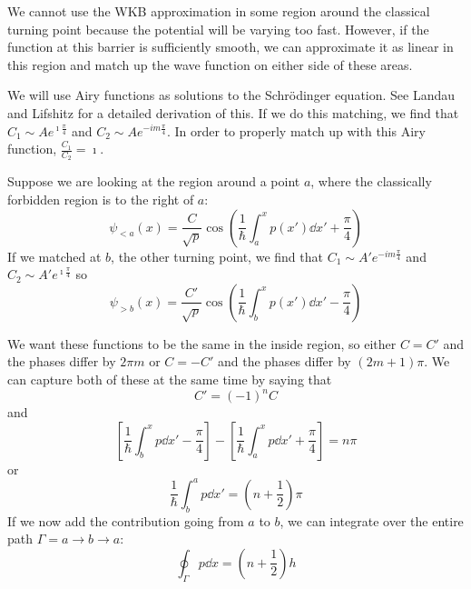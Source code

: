 \documentclass[a4paper,twoside,master.tex]{subfiles}
\begin{document}
We cannot use the WKB approximation in some region around the classical turning point because the potential will be varying too fast. However, if the function at this barrier is sufficiently smooth, we can approximate it as linear in this region and match up the wave function on either side of these areas.

We will use Airy functions as solutions to the Schr\"odinger equation. See Landau and Lifshitz for a detailed derivation of this. If we do this matching, we find that $ C_1 \sim A e^{\imath \frac{\pi}{4}} $ and $ C_2 \sim A e^{-im \frac{\pi}{4}} $. In order to properly match up with this Airy function, $ \frac{C_1}{C_2} = \imath $.

Suppose we are looking at the region around a point $ a $, where the classically forbidden region is to the right of $ a $:
\begin{equation}
    \psi_{<a}(x) = \frac{C}{\sqrt{p}} \cos(\frac{1}{\hbar} \int_a^x p(x') \dd{x'} + \frac{\pi}{4})
\end{equation}
If we matched at $ b $, the other turning point, we find that $ C_1 \sim A' e^{-im \frac{\pi}{4}} $ and $ C_2 \sim A' e^{\imath \frac{\pi}{4}}$ so
\begin{equation}
    \psi_{>b}(x) = \frac{C'}{\sqrt{p}} \cos(\frac{1}{\hbar} \int_b^x p(x') \dd{x'} - \frac{\pi}{4})
\end{equation}

We want these functions to be the same in the inside region, so either $ C = C' $ and the phases differ by $ 2 \pi m $ or $ C = -C' $ and the phases differ by $ (2m+1) \pi $. We can capture both of these at the same time by saying that
\begin{equation}
    C' = (-1)^n C
\end{equation}
and
\begin{equation}
    \left[ \frac{1}{\hbar} \int_b^x p \dd{x'} - \frac{\pi}{4} \right] - \left[ \frac{1}{\hbar} \int_a^x p \dd{x'} + \frac{\pi}{4} \right] = n \pi
\end{equation}
or
\begin{equation}
    \frac{1}{\hbar} \int_b^a p \dd{x'} = \left( n + \frac{1}{2} \right) \pi
\end{equation}
If we now add the contribution going from $ a $ to $ b $, we can integrate over the entire path $ \Gamma = a \to b \to a $:
\begin{equation}
    \oint_\Gamma p \dd{x} = \left( n + \frac{1}{2} \right) h
\end{equation}
\end{document}
